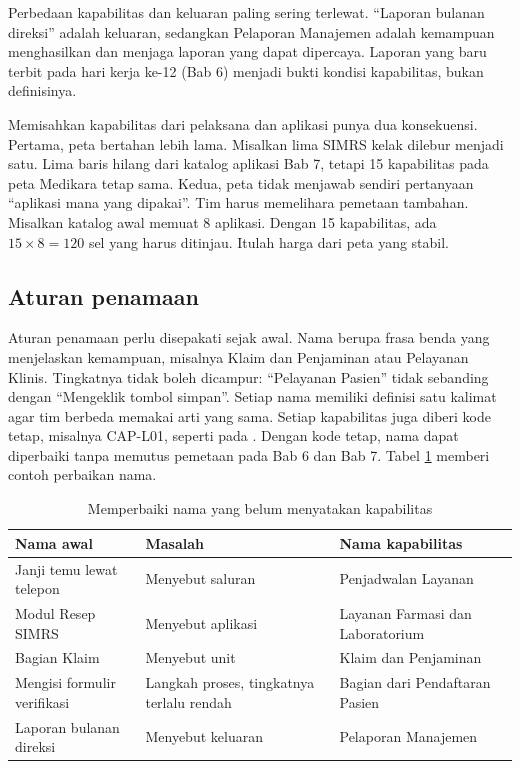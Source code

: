 Perbedaan kapabilitas dan keluaran paling sering terlewat. ``Laporan bulanan direksi''
adalah keluaran, sedangkan
Pelaporan Manajemen adalah kemampuan menghasilkan dan menjaga laporan yang dapat dipercaya.
Laporan yang baru terbit pada hari kerja ke-12 (Bab 6) menjadi bukti kondisi kapabilitas,
bukan definisinya.

Memisahkan kapabilitas dari pelaksana dan aplikasi punya dua konsekuensi. Pertama, peta
bertahan lebih lama. Misalkan lima SIMRS kelak dilebur menjadi satu. Lima baris hilang dari
katalog aplikasi Bab 7, tetapi 15 kapabilitas pada peta Medikara tetap sama. Kedua, peta
tidak menjawab sendiri pertanyaan ``aplikasi mana yang dipakai''. Tim harus memelihara
pemetaan tambahan. Misalkan katalog awal memuat 8 aplikasi. Dengan 15 kapabilitas, ada
$15 \times 8 = 120$ sel yang harus ditinjau. Itulah harga dari peta yang stabil.

\subsection*{Aturan penamaan}

Aturan penamaan perlu disepakati sejak awal. Nama berupa frasa benda yang menjelaskan
kemampuan, misalnya Klaim dan Penjaminan atau Pelayanan Klinis. Tingkatnya tidak boleh
dicampur: ``Pelayanan Pasien'' tidak sebanding dengan ``Mengeklik tombol simpan''. Setiap
nama memiliki definisi satu kalimat agar tim berbeda memakai arti yang sama. Setiap
kapabilitas juga diberi kode tetap, misalnya CAP-L01, seperti pada
. Dengan kode tetap, nama dapat
diperbaiki tanpa memutus pemetaan pada Bab 6 dan Bab 7. Tabel \ref{tab:ch05-aturan-nama}
memberi contoh perbaikan nama.

\begin{table}[!htb]
  \centering
  \caption{Memperbaiki nama yang belum menyatakan kapabilitas}
  \label{tab:ch05-aturan-nama}
  \small
  \begin{tabularx}{\textwidth}{>{\raggedright\arraybackslash}p{3.8cm}>{\raggedright\arraybackslash}X>{\raggedright\arraybackslash}p{3.8cm}}
    \hline
    \textbf{Nama awal} & \textbf{Masalah} & \textbf{Nama kapabilitas} \\
    \hline
    Janji temu lewat telepon & Menyebut saluran & Penjadwalan Layanan \\
    \hline
    Modul Resep SIMRS & Menyebut aplikasi & Layanan Farmasi dan Laboratorium \\
    \hline
    Bagian Klaim & Menyebut unit & Klaim dan Penjaminan \\
    \hline
    Mengisi formulir verifikasi & Langkah proses, tingkatnya terlalu rendah & Bagian dari Pendaftaran Pasien \\
    \hline
    Laporan bulanan direksi & Menyebut keluaran & Pelaporan Manajemen \\
    \hline
  \end{tabularx}
\end{table}

